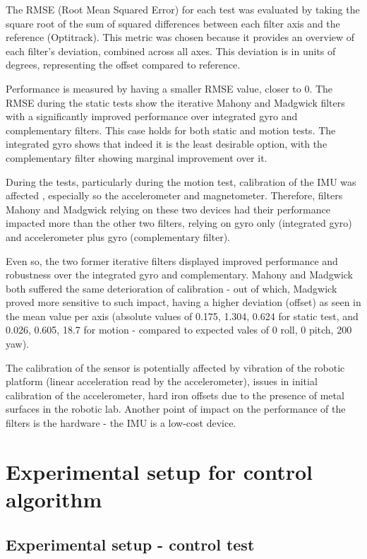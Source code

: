 The RMSE (Root Mean Squared Error) for each test was evaluated by taking the square root of the sum of squared differences between each filter axis and the reference (Optitrack). This metric was chosen because it provides an overview of each filter's deviation, combined across all axes. This deviation is in units of degrees, representing the offset compared to reference. 

Performance is measured by having a smaller RMSE value, closer to 0. 
The RMSE during the static tests show the iterative Mahony and Madgwick filters with a significantly improved performance over integrated gyro and complementary filters. This case holds for both static and motion tests.  The integrated gyro shows that indeed it is the least desirable option, with the complementary filter showing marginal improvement over it. 

During the tests, particularly during the motion test, calibration of the IMU was affected , especially so the accelerometer and magnetometer.
Therefore, filters Mahony and Madgwick relying on these two devices had their performance impacted more than the other two filters, relying on gyro only (integrated gyro) and accelerometer plus gyro (complementary filter). 

Even so, the two former iterative filters displayed improved performance and robustness over the integrated gyro and complementary. Mahony and Madgwick both suffered the same deterioration of calibration - out of which, Madgwick proved more sensitive to such impact, having a higher deviation (offset) as seen in the mean value per axis (absolute values of 0.175, 1.304, 0.624 for static test, and 0.026, 0.605, 18.7 for motion - compared to expected vales of 0 roll, 0 pitch, 200 yaw).

The calibration of the sensor is potentially affected by vibration of the robotic platform (linear acceleration read by the accelerometer), issues in initial calibration of the accelerometer, hard iron offsets due to the presence of metal surfaces in the robotic lab. Another point of impact on the performance of the filters is the hardware - the IMU is a low-cost device. 


\section{Experimental setup for control algorithm}


\subsection{Experimental setup - control test}

